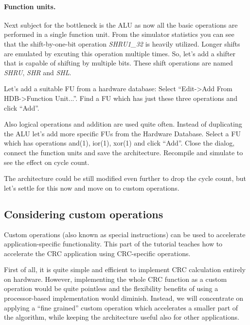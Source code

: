 \documentclass[a4paper,twoside]{tceusermanual}
\begin{document}
\paragraph{Function units.}
Next subject for the bottleneck is the ALU as now all the basic operations
are performed in a single function unit. From the simulator statistics you can
see that the shift-by-one-bit operation \textit{SHRU1\_32} is heavily utilized.
Longer shifts are emulated by excuting this operation multiple times. So,
let's add a shifter that is capable of shifting by multiple bits. These shift
operations are named \textit{SHRU}, \textit{SHR} and \textit{SHL}.

Let's add a suitable FU from a hardware database:
Select ``Edit->Add From HDB->Function Unit...''. Find a FU which has just
these three operations and click ``Add''.

Also logical operations and addition are used quite often. Instead
of duplicating the ALU let's add more specific FUs from the Hardware Database.
Select a FU which has operations and(1), ior(1), xor(1) and click ``Add''. Close the dialog,
connect the function units and save the architecture. Recompile and simulate
to see the effect on cycle count.

The architecture could be still modified even further to drop the cycle count,
but let's settle for this now and move on to custom operations.


\subsection{Considering custom operations}
\label{ssec:anal_custom}

Custom operations (also known as special instructions) can be used to accelerate
application-specific functionality. This part of the tutorial teaches how to
accelerate the CRC application using CRC-specific operations.


First of all, it is quite simple and efficient to implement CRC
calculation entirely on hardware. However, implementing the whole CRC
function as a custom operation would be quite pointless and the
flexibility benefits of using a processor-based implementation would diminish.
Instead, we will concentrate on applying a ``fine grained'' custom
operation which accelerates a smaller part of the algorithm, while
keeping the architecture useful also for other applications.
\end{document}
